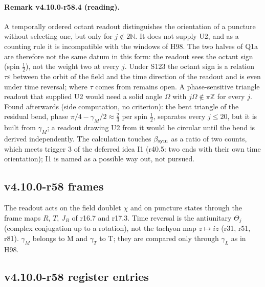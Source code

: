 \paragraph{Remark v4.10.0-r58.4 (reading).}
A temporally ordered octant readout distinguishes the orientation of a puncture without selecting one, but only for \(j\notin2\mathbb N\).  It does not supply
U2, and as a counting rule it is incompatible with the windows of H98.  The two halves of Q1a are therefore not the same datum in this form: the
readout sees the octant sign (spin \(\tfrac12\)), not the weight two at every \(j\).  Under S123 the octant sign is a relation \(\tau\varepsilon\) between the
orbit of the field and the time direction of the readout and is even under time reversal; where \(\tau\) comes from remains open.  A phase-sensitive
triangle readout that supplied U2 would need a solid angle \(\Omega\) with \(j\Omega\notin\pi\mathbb Z\) for every \(j\).  Found afterwards (side computation, no
criterion): the bent triangle of the residual bend, phase \(\pi/4-\gamma_M/2\approx\tfrac23\) per spin \(\tfrac12\), separates every \(j\le20\), but it is built from \(\gamma_M\);
a readout drawing U2 from it would be circular until the bend is derived independently.  The calculation touches \(\beta_{\rm sym}\) as a ratio of two
counts, which meets trigger 3 of the deferred idea I1 (r40.5: two ends with their own time orientation); I1 is named as a possible way out, not
pursued.

\subsection*{v4.10.0-r58 frames}
\label{subsec:v4100-r58-frames}

The readout acts on the field doublet \(\chi\) and on puncture states through the frame maps \(R\), \(T\), \(J_B\) of r16.7 and r17.3.  Time reversal is the
antiunitary \(\Theta_j\) (complex conjugation up to a rotation), not the tachyon map \(z\mapsto iz\) (r31, r51, r81).  \(\gamma_M\) belongs to M and \(\gamma_T\) to T; they
are compared only through \(\gamma_L\) as in H98.

\subsection*{v4.10.0-r58 register entries}
\label{subsec:v4100-r58-register}

